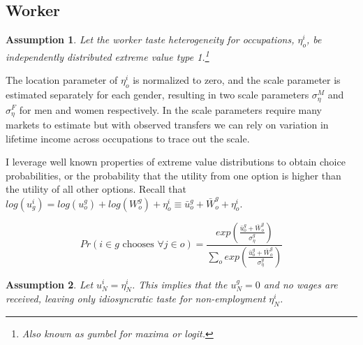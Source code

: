 \documentclass[11pt]{article}
\newtheorem{assumption}{Assumption}
\begin{document}







\subsection{Worker}

\begin{assumption}
Let the worker taste heterogeneity for occupations, $\eta^i_o$, be independently distributed extreme value type 1.\footnote{Also known as gumbel for maxima or logit.} 
\end{assumption}

The location parameter of $\eta^i_o$ is normalized to zero, and the scale parameter is estimated separately for each gender, resulting in two scale parameters $\sigma^M_{\eta}$ and $\sigma^F_{\eta}$ for men and women respectively. In  the scale parameters require many markets to estimate but with observed transfers we can rely on variation in lifetime income across occupations to trace out the scale.

I leverage well known properties of extreme value distributions to obtain choice probabilities, or the probability that the utility from one option is higher than the utility of all other options. Recall that $log(u^i_g) = log(u^g_o) + log(W^g_o)  + \eta^i_o \equiv  \bar{u}^{g}_o + \bar{W}^g_o   + \eta^i_o  $.


$$ Pr(i \in g \text{ chooses } \forall  j \in o) = \frac{exp(\frac{\bar{u}^{g}_o + \bar{W}^g_o}{\sigma^g_{\eta}})}{\sum_o exp(\frac{\bar{u}^{g}_o + \bar{W}^g_o}{\sigma^g_{\eta}})}$$


\begin{assumption}
Let $u^i_N = \eta^i_N$. This implies that the $u^g_N=0$ and no wages are received, leaving only idiosyncratic taste for non-employment $\eta^i_N$.
\end{assumption}
\end{document}

